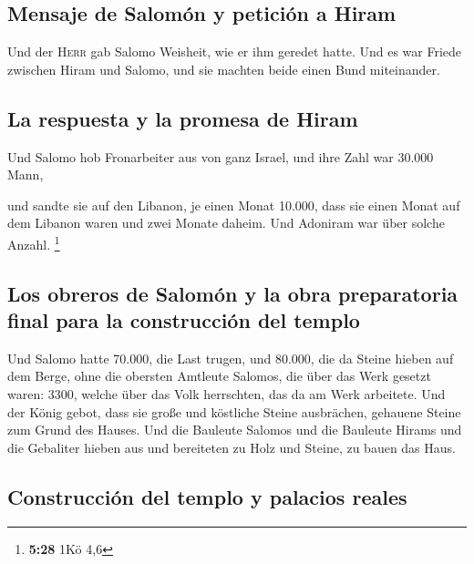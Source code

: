 \hypertarget{mensaje-de-salomuxf3n-y-peticiuxf3n-a-hiram}{%
\subsection{Mensaje de Salomón y petición a
Hiram}\label{mensaje-de-salomuxf3n-y-peticiuxf3n-a-hiram}}

 Und der \textsc{Herr} gab Salomo Weisheit, wie er ihm
geredet hatte. Und es war Friede zwischen Hiram und Salomo, und sie
machten beide einen Bund miteinander.

\hypertarget{la-respuesta-y-la-promesa-de-hiram}{%
\subsection{La respuesta y la promesa de
Hiram}\label{la-respuesta-y-la-promesa-de-hiram}}

 Und Salomo hob Fronarbeiter aus von ganz Israel, und
ihre Zahl war 30.000 Mann,

 und sandte sie auf den Libanon, je einen Monat 10.000,
dass sie einen Monat auf dem Libanon waren und zwei Monate daheim. Und
Adoniram war über solche Anzahl. \footnote{\textbf{5:28} 1Kö 4,6}

\hypertarget{los-obreros-de-salomuxf3n-y-la-obra-preparatoria-final-para-la-construcciuxf3n-del-templo}{%
\subsection{Los obreros de Salomón y la obra preparatoria final para la
construcción del
templo}\label{los-obreros-de-salomuxf3n-y-la-obra-preparatoria-final-para-la-construcciuxf3n-del-templo}}

 Und Salomo hatte 70.000, die Last trugen, und 80.000,
die da Steine hieben auf dem Berge,  ohne die obersten
Amtleute Salomos, die über das Werk gesetzt waren: 3300, welche über das
Volk herrschten, das da am Werk arbeitete.  Und der König
gebot, dass sie große und köstliche Steine ausbrächen, gehauene Steine
zum Grund des Hauses.  Und die Bauleute Salomos und die
Bauleute Hirams und die Gebaliter hieben aus und bereiteten zu Holz und
Steine, zu bauen das Haus.

\hypertarget{construcciuxf3n-del-templo-y-palacios-reales}{%
\subsection{Construcción del templo y palacios
reales}\label{construcciuxf3n-del-templo-y-palacios-reales}}

